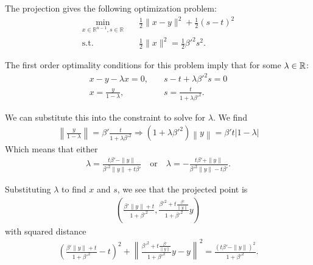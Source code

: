 The projection gives the following optimization problem:
\begin{align*}
\min_{x \in \mathbb R^{n-1}, s \in \mathbb R} & \quad \frac 1 2 \|x - y\|^2 + \frac 1 2 (s - t)^2 \\
	\textrm{s.t.}		& \quad \frac 1 2 \|x\|^2 = \frac 1 2 {\beta'}^2 s^2.
\end{align*}


%

The first order optimality conditions for this problem imply that for some $\lambda \in \mathbb R$:
\begin{align*}
x - y - \lambda x = 0, & \quad s - t + \lambda {\beta'}^2 s = 0 \\
x = \frac {y}{1 - \lambda}, & \quad s = \frac {t}{1 + \lambda {\beta'}^2 }.
\end{align*}

We can substitute this into the constraint to solve for $\lambda$.
We find
\begin{align*}
\left\|\frac {y}{1 - \lambda}\right\| = {\beta'} \frac {t}{1 + \lambda {\beta'}^2 } \Longrightarrow
\left(1 + \lambda {\beta'}^2\right) \left\|y\right\| = {\beta'}  {t} \left|1 - \lambda\right|
\end{align*}
Which means that either
\begin{align*}
\lambda = \frac{t {\beta'} - \|y\|}{{\beta'}^2\|y\| + t {\beta'}}
\quad\textrm{or}\quad
\lambda = -\frac{t {\beta'} + \|y\|}{{\beta'}^2\|y\| - t {\beta'}}.
\end{align*}





Substituting $\lambda$ to find $x$ and $s$, we see that the projected point is
\begin{align*}
\left(\frac{{\beta'} \|y\| + t}{1 + {\beta'} ^ 2}, \frac{{\beta'} ^ 2 + t \frac {{\beta'}}{\|y\|}}{1 + {\beta'} ^ 2}y\right)
\end{align*}
with squared distance
\begin{align*}
\left(\frac{{\beta'} \|y\| + t}{1 + {\beta'} ^ 2} - t\right)^2 + \left\|\frac{{\beta'} ^ 2 + t \frac {{\beta'}}{\|y\|}}{1 + {\beta'} ^ 2}y - y\right\|^2
= \frac{\left(t \beta' - \|y\|\right)^2}{1 + {\beta'}^2}.
\end{align*}

